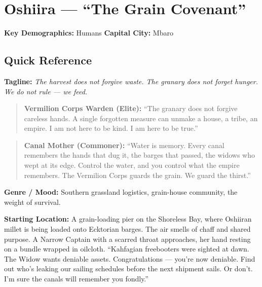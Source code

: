 \section{Oshiira --- ``The Grain Covenant''}
\label{chap:oshiira}

\textbf{Key Demographics: } Humans
\textbf{Capital City: } Mbaro

\subsection*{Quick Reference}
\textbf{Tagline:} \textit{The harvest does not forgive waste. The granary does not forget hunger. We do not rule --- we feed.}

\begin{quote}
  \textbf{Vermilion Corps Warden (Elite):}  
  ``The granary does not forgive careless hands. A single forgotten measure can unmake a house, a tribe, an empire. I am not here to be kind. I am here to be true.''
\end{quote}

\begin{quote}
  \textbf{Canal Mother (Commoner):}  
  ``Water is memory. Every canal remembers the hands that dug it, the barges that passed, the widows who wept at its edge. Control the water, and you control what the empire remembers. The Vermilion Corps guards the grain. We guard the thirst.''
\end{quote}

\noindent\textbf{Genre / Mood:} Southern grassland logistics, grain-house community, the weight of survival.

\noindent\textbf{Starting Location:} A grain-loading pier on the Shoreless Bay, where Oshiiran millet is being loaded onto Ecktorian barges. The air smells of chaff and shared purpose. A Narrow Captain with a scarred throat approaches, her hand resting on a bundle wrapped in oilcloth. ``Kahfagian freebooters were sighted at dawn. The Widow wants deniable assets. Congratulations --- you're now deniable. Find out who's leaking our sailing schedules before the next shipment sails. Or don't. I'm sure the canals will remember you fondly.''

